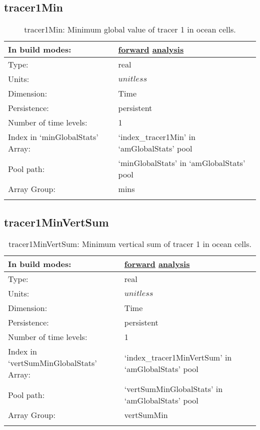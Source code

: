 \subsection[tracer1Min]{tracer1Min}
\label{subsec:var_sec_amGlobalStats_tracer1Min}
\begin{center}
\begin{longtable}{| p{2.0in} | p{4.0in} |}
        \hline 
        In build modes: & \hyperref[subsec:forward_var_tab_amGlobalStats]{forward} \hyperref[subsec:analysis_var_tab_amGlobalStats]{analysis} \\
        \hline 
        Type: & real \\
        \hline 
        Units: & $unitless$ \\
        \hline 
        Dimension: & Time \\
        \hline 
        Persistence: & persistent \\
        \hline 
        Number of time levels: & 1 \\
        \hline 
		 Index in `minGlobalStats' Array: & `index\_tracer1Min' in `amGlobalStats' pool \\
		 \hline 
            Pool path: & `minGlobalStats' in `amGlobalStats' pool \\
		 \hline 
		 Array Group: & mins \\
		 \hline 
    \caption{tracer1Min: Minimum global value of tracer 1 in ocean cells.}
\end{longtable}
\end{center}
\subsection[tracer1MinVertSum]{tracer1MinVertSum}
\label{subsec:var_sec_amGlobalStats_tracer1MinVertSum}
\begin{center}
\begin{longtable}{| p{2.0in} | p{4.0in} |}
        \hline 
        In build modes: & \hyperref[subsec:forward_var_tab_amGlobalStats]{forward} \hyperref[subsec:analysis_var_tab_amGlobalStats]{analysis} \\
        \hline 
        Type: & real \\
        \hline 
        Units: & $unitless$ \\
        \hline 
        Dimension: & Time \\
        \hline 
        Persistence: & persistent \\
        \hline 
        Number of time levels: & 1 \\
        \hline 
		 Index in `vertSumMinGlobalStats' Array: & `index\_tracer1MinVertSum' in `amGlobalStats' pool \\
		 \hline 
            Pool path: & `vertSumMinGlobalStats' in `amGlobalStats' pool \\
		 \hline 
		 Array Group: & vertSumMin \\
		 \hline 
    \caption{tracer1MinVertSum: Minimum vertical sum of tracer 1 in ocean cells.}
\end{longtable}
\end{center}
